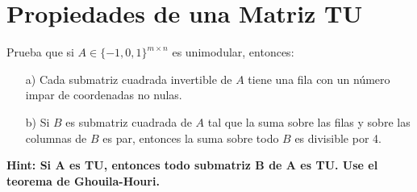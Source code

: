 \documentclass[10pt]{article}
\theoremstyle{plain}
\theoremstyle{definition}
\begin{document}
\section{Propiedades de una Matriz TU}
Prueba que si $A\in\{-1,0,1\}^{m\times n}$ es unimodular, entonces:
\begin{itemize}
    \item[a)] Cada submatriz cuadrada invertible de $A$ tiene una fila con un número impar de coordenadas no nulas.
    \item[b)] Si $B$ es submatriz cuadrada de $A$ tal que la suma sobre las filas y sobre las columnas de $B$ es par, entonces la suma sobre todo $B$ es divisible por 4.
\end{itemize}
\textbf{Hint: Si A es TU, entonces todo submatriz B de A es TU. Use el teorema de Ghouila-Houri.}
\end{document}
